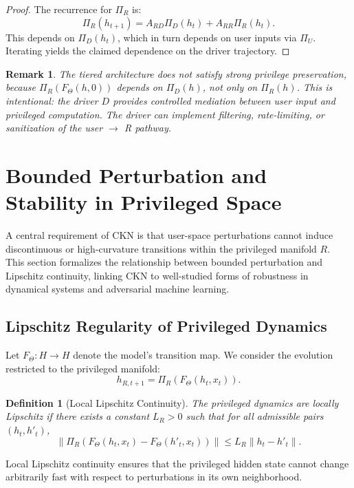 \documentclass[11pt,a4paper]{article}
\newtheorem{definition}[theorem]{Definition}
\newtheorem*{remark}{Remark}
\begin{document}
\begin{proof}
The recurrence for $\Pi_R$ is:
\[
\Pi_R(h_{t+1}) = A_{RD} \Pi_D(h_t) + A_{RR} \Pi_R(h_t).
\]
This depends on $\Pi_D(h_t)$, which in turn depends on user inputs via $\Pi_U$. Iterating yields the claimed dependence on the driver trajectory.
\end{proof}

\begin{remark}
The tiered architecture does \emph{not} satisfy strong privilege preservation, because $\Pi_R(F_\Theta(h, 0))$ depends on $\Pi_D(h)$, not only on $\Pi_R(h)$. This is intentional: the driver $D$ provides controlled mediation between user input and privileged computation. The driver can implement filtering, rate-limiting, or sanitization of the user $\to$ R pathway.
\end{remark}

\section{Bounded Perturbation and Stability in Privileged Space}

A central requirement of CKN is that user-space perturbations cannot induce discontinuous or high-curvature transitions within the privileged manifold $R$. This section formalizes the relationship between bounded perturbation and Lipschitz continuity, linking CKN to well-studied forms of robustness in dynamical systems and adversarial machine learning.

\subsection{Lipschitz Regularity of Privileged Dynamics}

Let $F_\Theta: H \to H$ denote the model's transition map. We consider the evolution restricted to the privileged manifold:
\[
h_{R,t+1} = \Pi_R(F_\Theta(h_t, x_t)).
\]

\begin{definition}[Local Lipschitz Continuity]
The privileged dynamics are locally Lipschitz if there exists a constant $L_R > 0$ such that for all admissible pairs $(h_t, h'_t)$,
\begin{equation}
\|\Pi_R(F_\Theta(h_t, x_t) - F_\Theta(h'_t, x_t))\| \leq L_R \|h_t - h'_t\|.
\end{equation}
\end{definition}

Local Lipschitz continuity ensures that the privileged hidden state cannot change arbitrarily fast with respect to perturbations in its own neighborhood.
\end{document}
